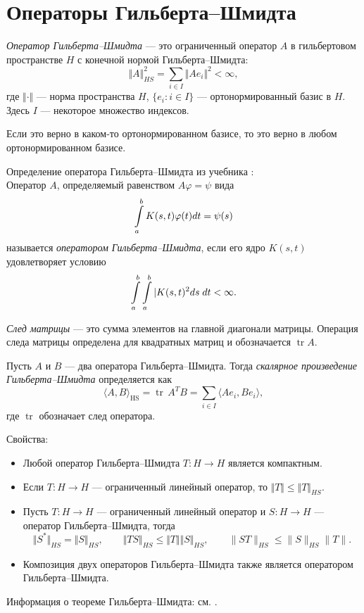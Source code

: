 \section{Операторы Гильберта--Шмидта}
\label{sec:q-40}
\textit{Оператор Гильберта--Шмидта} --- это ограниченный оператор $A$ в гильбертовом пространстве $H$ с конечной нормой Гильберта--Шмидта:
$$\Vert A \Vert_{HS}^2 = \sum_{i \in I} \Vert A e_i \Vert^2 < \infty,$$
где $\Vert \cdot \Vert$ --- норма пространства $H$, $\{e_i : i \in I\}$ --- ортонормированный базис в $H$. Здесь $I$ --- некоторое множество индексов.

Если это верно в каком-то ортонормированном базисе, то это верно в любом ортонормированном базисе.

Определение оператора Гильберта--Шмидта из учебника \cite[с.~460]{kolmogorov}:\\
Оператор $A$, определяемый равенством $A \varphi = \psi$ вида
$$\int\displaylimits_{a}^{b}K(s, t) \varphi(t)dt = \psi(s)$$
называется \textit{оператором Гильберта--Шмидта}, если его ядро $K(s, t)$ удовлетворяет условию
$$\int\displaylimits_a^b\int\displaylimits_a^b|K(s, t)^2 ds\;dt < \infty.$$

\textit{След матрицы} --- это сумма элементов на главной диагонали матрицы. Операция следа матрицы определена для квадратных матриц и обозначается $\operatorname{tr} A$.

Пусть $A$ и $B$ — два оператора Гильберта--Шмидта. Тогда \textit{скалярное произведение Гильберта--Шмидта} определяется как
$$\langle A,B \rangle_\mathrm{HS} = \operatorname{tr}\,A^TB
= \sum_{i \in I} \langle Ae_i, Be_i \rangle,$$
где $\operatorname{tr}$ обозначает след оператора.

Свойства:
\begin{itemize}
	\itemsep0pt
	\item Любой оператор Гильберта--Шмидта $T : H \to H$ является компактным.
	\item Если $T : H \to H$ --- ограниченный линейный оператор, то $\Vert T \Vert \leqslant \Vert T \Vert_{HS}$.
	\item Пусть $T : H \to H$ --- ограниченный линейный оператор и $S : H \to H$ --- оператор Гильберта--Шмидта, тогда
	$$\Vert S^* \Vert_{HS} = \Vert S \Vert_{HS}, \qquad \Vert TS \Vert_{HS} \leqslant \Vert T \Vert \Vert S \Vert_{HS}, \qquad \|ST\|_{HS} \leqslant \|S\|_{HS}\|T\|.$$
	\item Композиция двух операторов Гильберта--Шмидта также является оператором Гильберта--Шмидта.
\end{itemize}

Информация о теореме Гильберта--Шмидта: см. \cite{hilbert-schmidt-theorem}.
